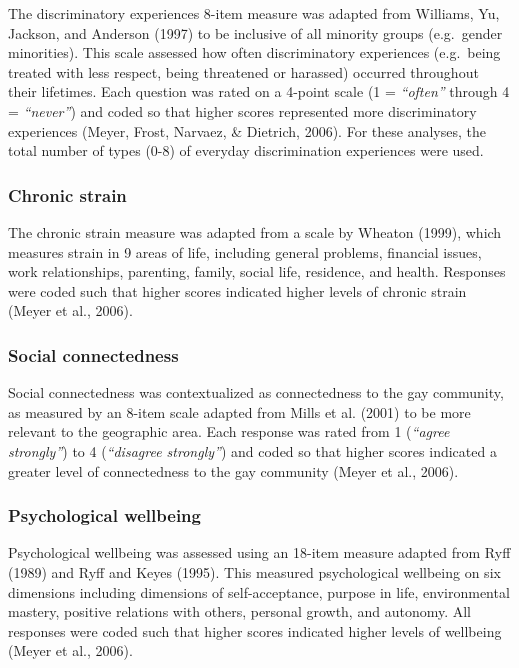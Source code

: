 \documentclass[
  english,
  man,floatsintext]{apa6}
\begin{document}
The discriminatory experiences 8-item measure was adapted from Williams, Yu, Jackson, and Anderson (1997) to be inclusive of all minority groups (e.g.~gender minorities). This scale assessed how often discriminatory experiences (e.g.~being treated with less respect, being threatened or harassed) occurred throughout their lifetimes. Each question was rated on a 4-point scale (1 = \emph{\enquote{often}} through 4 = \emph{\enquote{never}}) and coded so that higher scores represented more discriminatory experiences (Meyer, Frost, Narvaez, \& Dietrich, 2006). For these analyses, the total number of types (0-8) of everyday discrimination experiences were used.

\hypertarget{chronic-strain}{%
\subsubsection{Chronic strain}\label{chronic-strain}}

The chronic strain measure was adapted from a scale by Wheaton (1999), which measures strain in 9 areas of life, including general problems, financial issues, work relationships, parenting, family, social life, residence, and health. Responses were coded such that higher scores indicated higher levels of chronic strain (Meyer et al., 2006).

\hypertarget{social-connectedness}{%
\subsubsection{Social connectedness}\label{social-connectedness}}

Social connectedness was contextualized as connectedness to the gay community, as measured by an 8-item scale adapted from Mills et al. (2001) to be more relevant to the geographic area. Each response was rated from 1 (\emph{\enquote{agree strongly}}) to 4 (\emph{\enquote{disagree strongly}}) and coded so that higher scores indicated a greater level of connectedness to the gay community (Meyer et al., 2006).

\hypertarget{psychological-wellbeing}{%
\subsubsection{Psychological wellbeing}\label{psychological-wellbeing}}

Psychological wellbeing was assessed using an 18-item measure adapted from Ryff (1989) and Ryff and Keyes (1995). This measured psychological wellbeing on six dimensions including dimensions of self-acceptance, purpose in life, environmental mastery, positive relations with others, personal growth, and autonomy. All responses were coded such that higher scores indicated higher levels of wellbeing (Meyer et al., 2006).
\end{document}
